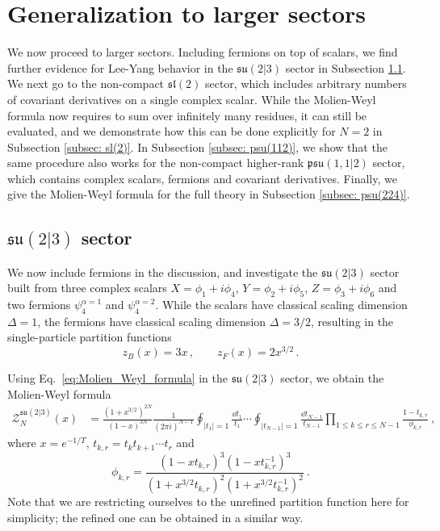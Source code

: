 \documentclass[a4paper,11pt]{article}
\begin{document}
\section{Generalization to larger sectors}
\label{sec: larger sectors}

We now proceed to larger sectors.
Including fermions on top of scalars, we find further evidence for Lee-Yang behavior in the $\mathfrak{su}(2|3)$ sector in Subsection \ref{subsec: su(23)}.
We next go to the non-compact $\mathfrak{sl}(2)$ sector, which includes arbitrary numbers of covariant derivatives on a single complex scalar. While the Molien-Weyl formula now requires to sum over infinitely many residues, it can still be evaluated, and we demonstrate how this can be done explicitly for $N=2$ in Subsection \ref{subsec: sl(2)}.
In Subsection \ref{subsec: psu(112)}, we show that the same procedure also works for the non-compact higher-rank $\mathfrak{psu}(1,1|2)$ sector, which contains complex scalars, fermions and covariant derivatives.
Finally, we give the Molien-Weyl formula for the full theory in Subsection \ref{subsec: psu(224)}.


\subsection{\texorpdfstring{$\mathfrak{su}(2|3)$}{su(2|3)} sector}
\label{subsec: su(23)}

We now include fermions in the discussion, and investigate the $\mathfrak{su}(2|3)$ sector built from three complex scalars $X=\phi_1+i\phi_4$, $Y=\phi_2+i\phi_5$, $Z=\phi_3+i\phi_6$ and two fermions $\psi^{\alpha=1}_{4}$ and $\psi^{\alpha=2}_{4}$. 
While the scalars have classical scaling dimension $\Delta=1$, the fermions have classical scaling dimension $\Delta=3/2$, resulting in the single-particle partition functions
\begin{equation}
 z_B(x)=3x\,,\qquad z_F(x)=2x^{3/2}\,.
\end{equation}

Using Eq.\ \eqref{eq:Molien_Weyl_formula} in the $\mathfrak{su}(2|3)$ sector, we obtain the Molien-Weyl formula
% 
\begin{equation} \label{eq:Molien_Weyl_su(2I3)}
\begin{split}
	\mathcal{Z}_N^{\mathfrak{su}(2|3)}(x) &=\frac{(1+x^{3/2})^{2N}}{(1-x)^{3N}} 
	 \frac{1}{(2\pi i)^{N-1}}  \oint_{|t_1|=1} \frac{\dd t_1}{t_1} \cdots \oint_{|t_{N-1}|=1} \frac{\dd t_{N-1}}{t_{N-1}}  \prod_{1\leq k\leq r\leq N-1} \frac{1-t_{k,r}}{\phi_{k,r}} \ ,
\end{split}
\end{equation}
where $x=e^{-1/T}$, $t_{k,r}=t_k t_{k+1}\cdots t_r$ and
% 
\begin{equation}
	\phi_{k,r} = \frac{(1-xt_{k,r})^3(1-xt_{k,r}^{-1})^3}{(1+x^{3/2}t_{k,r})^2(1+x^{3/2}t_{k,r}^{-1})^2} \ .
\end{equation}
Note that we are restricting ourselves to the unrefined partition function here for simplicity; the refined one can be obtained in a similar way. 
\end{document}
